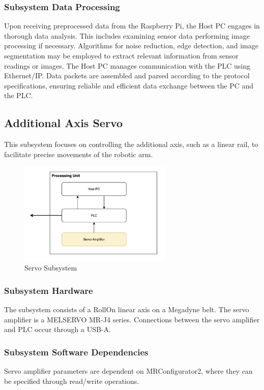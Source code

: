 \subsubsection{Subsystem Data Processing}
Upon receiving preprocessed data from the Raspberry Pi, the Host PC engages in thorough data analysis. This includes examining sensor data performing image processing if necessary. Algorithms for noise reduction, edge detection, and image segmentation may be employed to extract relevant information from sensor readings or images. The Host PC manages communication with the PLC using Ethernet/IP. Data packets are assembled and parsed according to the protocol specifications, ensuring reliable and efficient data exchange between the PC and the PLC.

\subsection{Additional Axis Servo}
This subsystem focuses on controlling the additional axis, such as a linear rail, to facilitate precise movements of the robotic arm.
\begin{figure}[h!]
	\centering
 	\includegraphics[width=0.65\textwidth]{images/ServoAmp.jpg}
 \caption{Servo Subsystem}
\end{figure}

\subsubsection{Subsystem Hardware}
The subsystem consists of a RollOn linear axis on a Megadyne belt. The servo amplifier is a MELSERVO MR-J4 series. Connections between the servo amplifier and PLC occur through a USB-A.
\subsubsection{Subsystem Software Dependencies}
Servo amplifier parameters are dependent on MRConfigurator2, where they can be specified through read/write operations.

